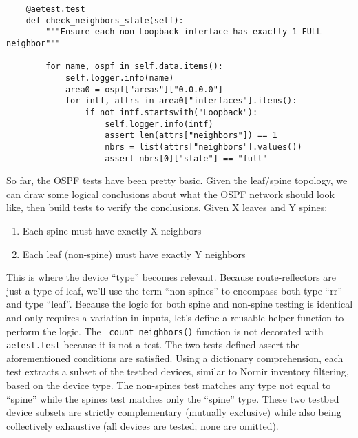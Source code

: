 \begin{verbatim}
    @aetest.test
    def check_neighbors_state(self):
        """Ensure each non-Loopback interface has exactly 1 FULL neighbor"""

        for name, ospf in self.data.items():
            self.logger.info(name)
            area0 = ospf["areas"]["0.0.0.0"]
            for intf, attrs in area0["interfaces"].items():
                if not intf.startswith("Loopback"):
                    self.logger.info(intf)
                    assert len(attrs["neighbors"]) == 1
                    nbrs = list(attrs["neighbors"].values())
                    assert nbrs[0]["state"] == "full"
\end{verbatim}

So far, the OSPF tests have been pretty basic. Given the leaf/spine topology,
we can draw some logical conclusions about what the OSPF network should look
like, then build tests to verify the conclusions. Given X leaves and Y spines:

\begin{enumerate}
  \item Each spine must have exactly X neighbors
  \item Each leaf (non-spine) must have exactly Y neighbors
\end{enumerate}

This is where the device ``type'' becomes relevant. Because route-reflectors
are just a type of leaf, we'll use the term ``non-spines'' to encompass both
type ``rr'' and type ``leaf''. Because the logic for both spine and non-spine
testing is identical and only requires a variation in inputs, let's define a
reusable helper function to perform the logic. The \verb|_count_neighbors()|
function is not decorated with \verb|aetest.test| because it is not a test.
The two tests defined assert the aforementioned conditions are satisfied.
Using a dictionary comprehension, each test extracts a subset of the testbed
devices, similar to Nornir inventory filtering, based on the device type.
The non-spines test matches any type not equal to ``spine'' while the spines
test matches only the ``spine'' type. These two testbed device subsets are
strictly complementary (mutually exclusive) while also being collectively
exhaustive (all devices are tested; none are omitted).

